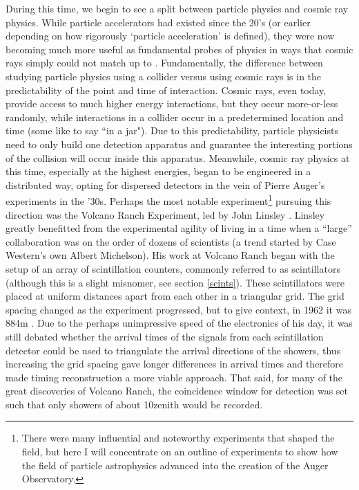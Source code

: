 During this time, we begin to see a split between particle physics and cosmic ray physics. While particle accelerators had existed since the 20's (or earlier depending on how rigorously `particle acceleration' is defined), they were now becoming much more useful as fundamental probes of physics in ways that cosmic rays simply could not match up to \cite{colliderhistory1}. Fundamentally, the difference between studying particle physics using a collider versus using cosmic rays is in the predictability of the point and time of interaction. Cosmic rays, even today, provide access to much higher energy interactions, but they occur more-or-less randomly, while interactions in a collider occur in a predetermined location and time (some like to say ``in a jar"). Due to this predictability, particle physicists need to only build one detection apparatus and guarantee the interesting portions of the collision will occur inside this apparatus. Meanwhile, cosmic ray physics at this time, especially at the highest energies, began to be engineered in a distributed way, opting for dispersed detectors in the vein of Pierre Auger's experiments in the '30s. 
Perhaps the most notable experiment\footnote{There were many influential and noteworthy experiments that shaped the field, but here I will concentrate on an outline of experiments to show how the field of particle astrophysics advanced into the creation of the Auger Observatory.} pursuing this direction was the Volcano Ranch Experiment, led by John Linsley \cite{linsley}. Linsley greatly benefitted from the experimental agility of living in a time when a ``large'' collaboration was on the order of dozens of scientists (a trend started by Case Western's own Albert Michelson). His work at Volcano Ranch began with the setup of an array of scintillation counters, commonly referred to as scintillators (although this is a slight misnomer, see section \ref{scints}). These scintillators were placed at uniform distances apart from each other in a triangular grid. The grid spacing changed as the experiment progressed, but to give context, in 1962 it was 884m \cite{volranch}. Due to the perhaps unimpressive speed of the electronics of his day, it was still debated whether the arrival times of the signals from each scintillation detector could be used to triangulate the arrival directions of the showers, thus increasing the grid spacing gave longer differences in arrival times and therefore made timing reconstruction a more viable approach. That said, for many of the great discoveries of Volcano Ranch, the coincidence window for detection was set such that only showers of about 10\degree zenith would be recorded. 

